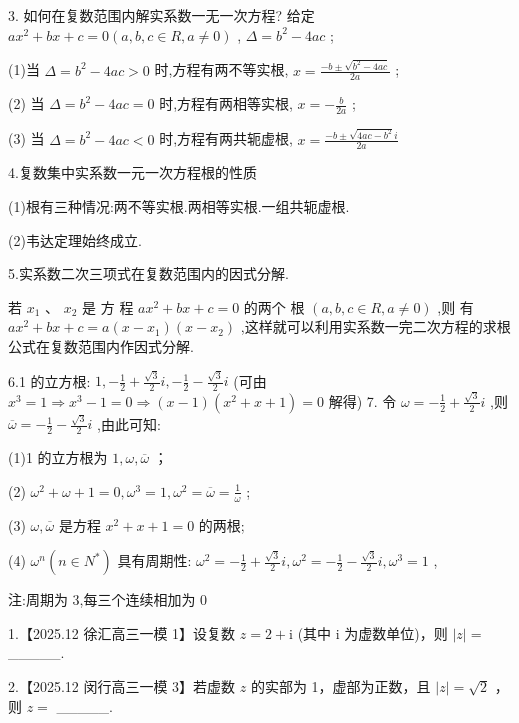 \documentclass[10pt]{article}
\begin{document}
3. 如何在复数范围内解实系数一无一次方程? 给定 \(a{x}^{2} + {bx} + c = 0\left( {a,b,c \in  R,a \neq  0}\right)\) , \(\Delta  = {b}^{2} - {4ac}\) ;

(1)当 \(\Delta  = {b}^{2} - {4ac} > 0\) 时,方程有两不等实根, \(x = \frac{-b \pm  \sqrt{{b}^{2} - {4ac}}}{2a}\) ;

(2) 当 \(\Delta  = {b}^{2} - {4ac} = 0\) 时,方程有两相等实根, \(x =  - \frac{b}{2a}\) ;

(3) 当 \(\Delta  = {b}^{2} - {4ac} < 0\) 时,方程有两共轭虚根, \(x = \frac{-b \pm  \sqrt{{4ac} - {b}^{2}}i}{2a}\)

4.复数集中实系数一元一次方程根的性质

(1)根有三种情况:两不等实根.两相等实根.一组共轭虚根.

(2)韦达定理始终成立.

5.实系数二次三项式在复数范围内的因式分解.

若 \({x}_{1}\text{ 、 }{x}_{2}\) 是 方 程 \(a{x}^{2} + {bx} + c = 0\) 的两个 根 \(\left( {a,b,c \in  R,a \neq  0}\right)\) ,则 有 \(a{x}^{2} + {bx} + c = a\left( {x - {x}_{1}}\right) \left( {x - {x}_{2}}\right)\) ,这样就可以利用实系数一完二次方程的求根公式在复数范围内作因式分解.

6.1 的立方根: \(1, - \frac{1}{2} + \frac{\sqrt{3}}{2}i, - \frac{1}{2} - \frac{\sqrt{3}}{2}i\) (可由 \({x}^{3} = 1 \Rightarrow  {x}^{3} - 1 = 0 \Rightarrow  \left( {x - 1}\right) \left( {{x}^{2} + x + 1}\right)  = 0\) 解得) 7. 令 \(\omega  =  - \frac{1}{2} + \frac{\sqrt{3}}{2}i\) ,则 \(\overline{\omega } =  - \frac{1}{2} - \frac{\sqrt{3}}{2}i\) ,由此可知:

(1)1 的立方根为 \(1,\omega ,\overline{\omega }\) ；

(2) \({\omega }^{2} + \omega  + 1 = 0,{\omega }^{3} = 1,{\omega }^{2} = \overline{\omega } = \frac{1}{\omega }\) ;

(3) \(\omega ,\overline{\omega }\) 是方程 \({x}^{2} + x + 1 = 0\) 的两根;

(4) \({\omega }^{n}\left( {n \in  {N}^{ * }}\right)\) 具有周期性: \({\omega }^{2} =  - \frac{1}{2} + \frac{\sqrt{3}}{2}i,{\omega }^{2} =  - \frac{1}{2} - \frac{\sqrt{3}}{2}i,{\omega }^{3} = 1\) ,

注:周期为 3,每三个连续相加为 0

1.【2025.12 徐汇高三一模 1】设复数 \(z = 2 + \mathrm{i}\) (其中 \(\mathrm{i}\) 为虚数单位)，则 \(\left| z\right|  =\) \_\_\_\_\_.

2.【2025.12 闵行高三一模 3】若虚数 \(z\) 的实部为 1，虚部为正数，且 \(\left| z\right|  = \sqrt{2}\) ，则 \(z =\) \_\_\_\_\_.
\end{document}
